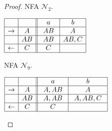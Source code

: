 \documentclass[preprint,12pt]{elsarticle}
\newcommand{\cN}{{\mathcal N}}
\begin{document}
\begin{proof}
\begin{table}[h]
\begin{minipage}[b]{0.45\linewidth}
\caption{NFA $\cN_2$.}
\label{tab:fn1}
{\footnotesize
\begin{center}
$
\begin{array}{|c| c||c| c| }    
\hline
& \ \  \ \ 
&\ \ a \ \ &\ \ b \ \ \\
\hline  
\rightarrow & A
& \ AB \ & \ A \ \\
\hline  
 & AB
&  AB  & AB,C \\
\hline  
\leftarrow & \ C \
 & \ C \ & \  \ \\
\hline  
\end{array}
$
\end{center}}
\end{minipage}
\hspace{0.1cm}
\begin{minipage}[b]{0.45\linewidth}
\caption{NFA $\cN_9$.}
\label{tab:fn9}
{\footnotesize
\begin{center}
$
\begin{array}{|c| c||c| c| c|c|}    
\hline
& \ \  \ \ 
&\ \ a \ \ &\ \ b \ \   \\
\hline  
\rightarrow & \ A \
&  \ A,AB \  &  \  A  \   \\
\hline  
 & AB
&  \  A,AB \  & \ A,AB,C \ \\
\hline  
\leftarrow & C
&   \ C  \  &      \\
\hline  
\end{array}
$
\end{center}}
\end{minipage}
\end{table}



\end{proof}
\end{document}
